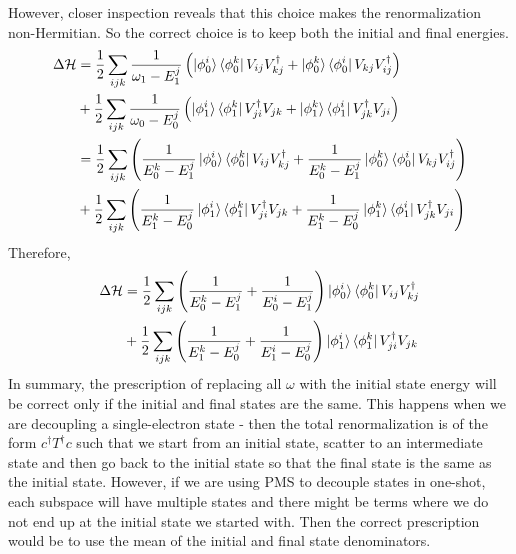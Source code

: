 \documentclass[twoside]{report}
\numberwithin{equation}{section}
\begin{document}
However, closer inspection reveals that this choice makes the renormalization non-Hermitian. So the correct choice is to keep both the initial and final energies.
\begin{equation}\begin{aligned}
	\Delta \mathcal{H} &= \frac{1}{2}\sum_{ijk}\frac{1}{\omega_1 - E^j_1}\left(\ket{\phi_0^i}\bra{\phi_0^k}V_{ij}V^\dagger_{kj} + \ket{\phi_0^k}\bra{\phi_0^i}V_{kj}V^\dagger_{ij}\right)\\
			   &+\frac{1}{2}\sum_{ijk}\frac{1}{\omega_0 - E^j_0}\left(\ket{\phi_1^i}\bra{\phi_1^k}V^\dagger_{ji}V_{jk} + \ket{\phi_1^k}\bra{\phi_1^i}V^\dagger_{jk}V_{ji}\right)\\
			   &= \frac{1}{2}\sum_{ijk}\left(\frac{1}{E_0^k - E^j_1}\ket{\phi_0^i}\bra{\phi_0^k}V_{ij}V^\dagger_{kj} + \frac{1}{E_0^k - E^j_1}\ket{\phi_0^k}\bra{\phi_0^i}V_{kj}V^\dagger_{ij}\right)\\
			   &+\frac{1}{2}\sum_{ijk}\left(\frac{1}{E_1^k - E^j_0}\ket{\phi_1^i}\bra{\phi_1^k}V^\dagger_{ji}V_{jk} + \frac{1}{E_1^k - E^j_0}\ket{\phi_1^k}\bra{\phi_1^i}V^\dagger_{jk}V_{ji}\right)
\end{aligned}\end{equation}
Therefore,
\begin{equation}\begin{aligned}
	\label{pmsren}
	\Delta \mathcal{H} &= \frac{1}{2}\sum_{ijk}\left(\frac{1}{E_0^k - E^j_1} + \frac{1}{E_0^i - E^j_1}\right)\ket{\phi_0^i}\bra{\phi_0^k}V_{ij}V^\dagger_{kj}\\
			   &+\frac{1}{2}\sum_{ijk}\left(\frac{1}{E_1^k - E^j_0}+ \frac{1}{E_1^i - E^j_0}\right)\ket{\phi_1^i}\bra{\phi_1^k}V^\dagger_{ji}V_{jk}\\
\end{aligned}\end{equation}
In summary, the prescription of replacing all \(\omega\) with the initial state energy will be correct only if the initial and final states are the same. This happens when we are decoupling a single-electron state - then the total renormalization is of the form \(c^\dagger T^\dagger c\) such that we start from an initial state, scatter to an intermediate state and then go back to the initial state so that the final state is the same as the initial state. However, if we are using PMS to decouple states in one-shot, each subspace will have multiple states and there might be terms where we do not end up at the initial state we started with. Then the correct prescription would be to use the mean of the initial and final state denominators.
\end{document}
